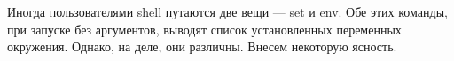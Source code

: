Иногда пользователями shell путаются две вещи --- set и env. Обе этих команды, при запуске без аргументов, выводят список установленных переменных окружения. Однако, на деле, они различны. Внесем некоторую ясность.